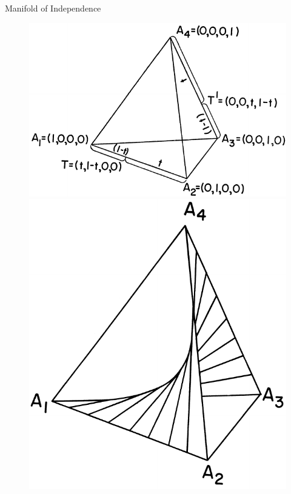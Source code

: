 \begin{frame}{Manifold of Independence}
    \begin{figure}[!htb]
    \centering
    \begin{minipage}{.5\textwidth}
        \centering
        \includegraphics[height=0.35\textheight]{resources/tetrahedron.pdf}
    \end{minipage}%
    \begin{minipage}{0.5\textwidth}
        \centering
        \includegraphics[height=0.40\textheight]{resources/independence-surface.pdf}
    \end{minipage}
    \end{figure}
    
\end{frame}